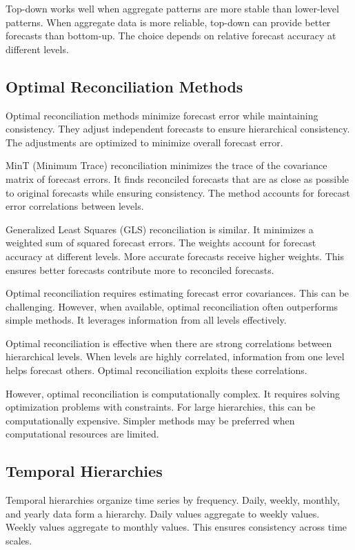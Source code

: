 Top-down works well when aggregate patterns are more stable than lower-level patterns. When aggregate data is more reliable, top-down can provide better forecasts than bottom-up. The choice depends on relative forecast accuracy at different levels.

\subsection{Optimal Reconciliation Methods}

Optimal reconciliation methods minimize forecast error while maintaining consistency. They adjust independent forecasts to ensure hierarchical consistency. The adjustments are optimized to minimize overall forecast error.

MinT (Minimum Trace) reconciliation minimizes the trace of the covariance matrix of forecast errors. It finds reconciled forecasts that are as close as possible to original forecasts while ensuring consistency. The method accounts for forecast error correlations between levels.

Generalized Least Squares (GLS) reconciliation is similar. It minimizes a weighted sum of squared forecast errors. The weights account for forecast accuracy at different levels. More accurate forecasts receive higher weights. This ensures better forecasts contribute more to reconciled forecasts.

Optimal reconciliation requires estimating forecast error covariances. This can be challenging. However, when available, optimal reconciliation often outperforms simple methods. It leverages information from all levels effectively.

Optimal reconciliation is effective when there are strong correlations between hierarchical levels. When levels are highly correlated, information from one level helps forecast others. Optimal reconciliation exploits these correlations.

However, optimal reconciliation is computationally complex. It requires solving optimization problems with constraints. For large hierarchies, this can be computationally expensive. Simpler methods may be preferred when computational resources are limited.

\subsection{Temporal Hierarchies}

Temporal hierarchies organize time series by frequency. Daily, weekly, monthly, and yearly data form a hierarchy. Daily values aggregate to weekly values. Weekly values aggregate to monthly values. This ensures consistency across time scales.


